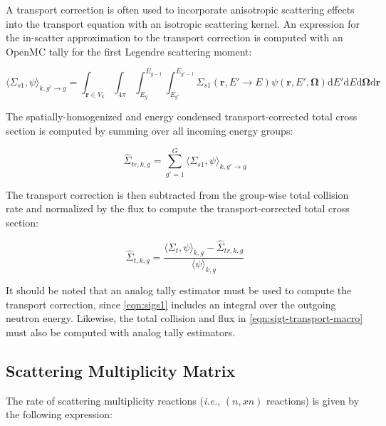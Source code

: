 A transport correction is often used to incorporate anisotropic scattering effects into the transport equation with an isotropic scattering kernel. An expression for the in-scatter approximation \cite{yamamoto2008simplified} to the transport correction is computed with an OpenMC tally for the first Legendre scattering moment:

\begin{equation}
\label{eqn:sigs1}
\langle \Sigma_{s1}, \psi \rangle_{k,g'\rightarrow g} = \int_{\mathbf{r} \in V_{k}} \int_{4\pi} \int_{E_{g}}^{E_{g-1}} \int_{E_{g'}}^{E_{g'-1}} \Sigma_{s1}(\mathbf{r},E'\rightarrow E)\psi(\mathbf{r},E',\mathbf{\Omega}) \mathrm{d}E'\mathrm{d}E\mathrm{d}\mathbf{\Omega}\mathrm{d}\mathbf{r}
\end{equation}

\noindent The spatially-homogenized and energy condensed transport-corrected total cross section is computed by summing over all incoming energy groups:

\begin{equation}
\label{eqn:transport-corr-macro}
\hat{\Sigma}_{tr,k,g} = \displaystyle\sum\limits_{g'=1}^{G} \langle{\Sigma_{s1}, \psi \rangle_{k,g'\rightarrow g}}
\end{equation}

\noindent The transport correction is then subtracted from the group-wise total collision rate and normalized by the flux to compute the transport-corrected total cross section:

\begin{equation}
\label{eqn:sigt-transport-macro}
\hat{\Sigma}_{t,k,g} = \frac{\langle \Sigma_{t}, \psi \rangle_{k,g} - \hat{\Sigma}_{tr,k,g}}{\langle \psi \rangle_{k,g}}
\end{equation}

It should be noted that an analog tally estimator must be used to compute the transport correction, since \autoref{eqn:sigs1} includes an integral over the outgoing neutron energy. Likewise, the total collision and flux in \autoref{eqn:sigt-transport-macro} must also be computed with analog tally estimators.

\subsection{Scattering Multiplicity Matrix}
\label{subsubsec:tally-types-mult-mat}

The rate of scattering multiplicity reactions (\textit{i.e.}, $(n,xn)$ reactions) is given by the following expression:

